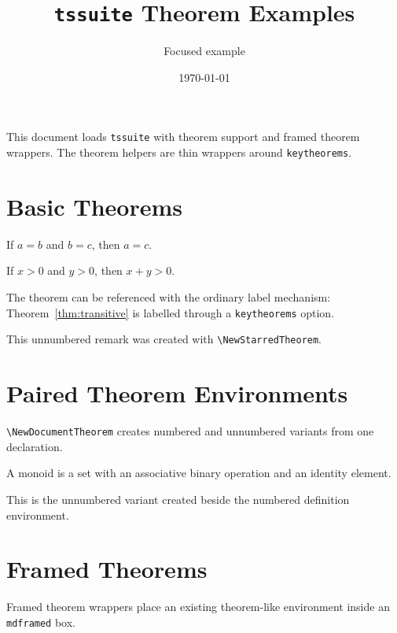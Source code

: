 \documentclass[a4paper,11pt]{article}
\title{\texttt{tssuite} Theorem Examples}
\author{Focused example}
\date{\today}
\begin{document}
\maketitle

This document loads \texttt{tssuite} with theorem support and framed theorem
wrappers. The theorem helpers are thin wrappers around \texttt{keytheorems}.

\section{Basic Theorems}

\begin{theorem}[label=thm:transitive,note=Transitivity]
If $a=b$ and $b=c$, then $a=c$.
\end{theorem}

\begin{lemma}[note=Shared counter]
If $x>0$ and $y>0$, then $x+y>0$.
\end{lemma}

The theorem can be referenced with the ordinary label mechanism:
Theorem~\ref{thm:transitive} is labelled through a \texttt{keytheorems} option.

\begin{remark}
This unnumbered remark was created with \verb|\NewStarredTheorem|.
\end{remark}

\section{Paired Theorem Environments}

\verb|\NewDocumentTheorem| creates numbered and unnumbered variants from one
declaration.

\begin{definition}[note=Numbered]
A monoid is a set with an associative binary operation and an identity element.
\end{definition}

\begin{definition*}
This is the unnumbered variant created beside the numbered definition
environment.
\end{definition*}

\section{Framed Theorems}

Framed theorem wrappers place an existing theorem-like environment inside an
\texttt{mdframed} box.
\end{document}
